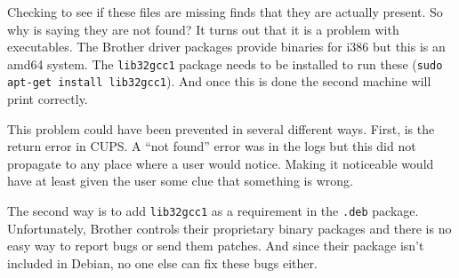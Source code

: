 \documentclass{article}
\begin{document}
Checking to see if these files are missing finds that they are
actually present.
So why is saying they are not found?
It turns out that it is a problem with executables.
The Brother driver packages provide binaries for i386 but this is
an amd64 system.  The \verb+lib32gcc1+ package needs to be installed
to run these (\verb+sudo apt-get install lib32gcc1+).
And once this is done the second machine will print correctly.

This problem could have been prevented in several different ways.
First, is the return error in CUPS.  A ``not found'' error was in the
logs but this did not propagate to any place where a user would
notice.  Making it noticeable would have at least given the user
some clue that something is wrong.

The second way is to add \verb+lib32gcc1+ as a
requirement in the \verb+.deb+ package.  Unfortunately, Brother
controls their proprietary binary packages and there is no easy
way to report bugs or send them patches.
And since their package isn't included in Debian,
no one else can fix these bugs either.

\end{document}
